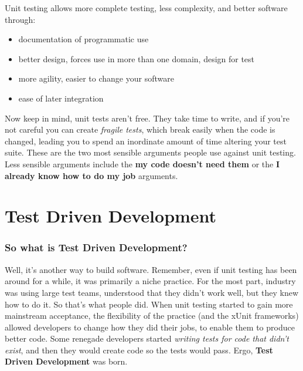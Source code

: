 \documentclass[t, 10pt]{beamer}
\begin{document}
\begin{frame}
Unit testing allows more complete testing, less complexity, and better software through:
\begin{itemize}
\item documentation of programmatic use
\item better design, forces use in more than one domain, design for test
\item more agility, easier to change your software
\item ease of later integration
\end{itemize}
Now keep in mind, unit tests aren't free.
\newline
\newline
\pause
They take time to write, and if you're not careful you can create \textit{fragile tests}, which break easily when the code is changed, leading you to spend an inordinate amount of time altering your test suite.  These are the two most sensible arguments people use against unit testing.  Less sensible arguments include the \textbf{my code doesn't need them} or the \textbf{I already know how to do my job} arguments.
\end{frame}

\section{Test Driven Development}

\begin{frame}
\frametitle{So what is Test Driven Development?}
Well, it's another way to build software.
\newline
\newline
\pause
Remember, even if unit testing has been around for a while, it was primarily a niche practice.  For the most part, industry was using large test teams, understood that they didn't work well, but they knew how to do it.  So that's what people did.  When unit testing started to gain more mainstream acceptance, the flexibility of the practice (and the xUnit frameworks) allowed developers to change how they did their jobs, to enable them to produce better code.
\newline
\newline
\pause
Some renegade developers started \textit{writing tests for code that didn't exist}, and then they would create code so the tests would pass.
\newline
\newline
Ergo, \textbf{Test Driven Development} was born.
\end{frame}
\end{document}
